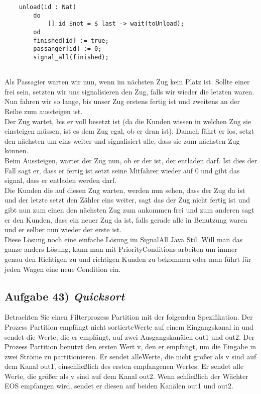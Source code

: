 \documentclass[ngerman,a4paper,11pt]{article}
\begin{document}
\begin{enumerate}[1.]
\begin{lstlisting}
	unload(id : Nat)
		do
			[] id $not = $ last -> wait(toUnload);
		od
		finished[id] := true;
		passanger[id] := 0;
		signal_all(finished);
		

	\end{lstlisting}

	Als Passagier warten wir nun, wenn im nächsten Zug kein Platz ist. Sollte einer frei sein, setzten wir uns signalisieren den Zug,
	falls wir wieder die letzten waren. Nun fahren wir so lange, bis unser Zug erstens fertig ist und zweitens an der Reihe zum aussteigen ist.\\
	Der Zug wartet, bis er voll besetzt ist (da die Kunden wissen in welchen Zug sie einsteigen müssen, ist es dem Zug egal,
	ob er dran ist).
	Danach fährt er los, setzt den nächsten um eins weiter und signalisiert alle, dass sie zum nächsten Zug können.\\
	Beim Aussteigen, wartet der Zug nun, ob er der ist, der entladen darf. Ist dies der Fall sagt er, dass er fertig ist
	setzt seine Mitfahrer wieder auf 0 und gibt das signal, dass er entladen werden darf.\\
	Die Kunden die auf diesen Zug warten, werden nun sehen, dass der Zug da ist und der letzte setzt den Zähler eins weiter,
	sagt das der Zug nicht fertig ist und gibt nun zum einen den nächsten Zug zum ankommen frei und zum anderen
	sagt er den Kunden, dass ein neuer Zug da ist, falls gerade alle in Benutzung waren und er selber nun wieder der erste ist.\\

	Diese Lösung noch eine einfache Lösung im SignalAll Java Stil. Will man das ganze anders Lösung, kann man mit PriorityConditions
	arbeiten um immer genau den Richtigen zu und richtigen Kunden zu bekommen oder man führt für jeden Wagen eine neue Condition
	ein.

\end{enumerate}

\pagebreak

\subsection*{Aufgabe 43) \mdseries\itshape Quicksort}

Betrachten Sie einen Filterprozess Partition mit der folgenden
Spezifikation. Der Prozess Partition empfängt nicht sortierteWerte auf einem Eingangskanal in
und sendet die Werte, die er empfängt, auf zwei Ausgangskanälen out1 und out2. Der Prozess
Partition benutzt den ersten Wert v, den er empfängt, um die Eingabe in zwei Ströme zu
partitionieren. Er sendet alleWerte, die nicht größer als v sind auf dem Kanal out1, einschließlich
des ersten empfangenen Wertes. Er sendet alle Werte, die größer als v sind auf dem Kanal out2.
Wenn schließlich der Wächter EOS empfangen wird, sendet er diesen auf beiden Kanälen out1
und out2.
\end{document}
